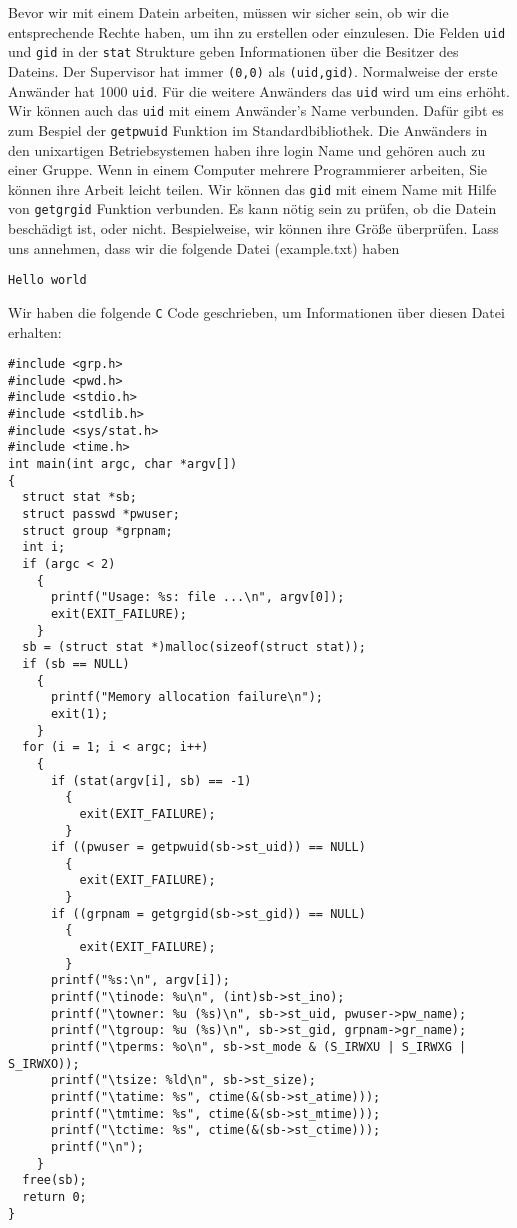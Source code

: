 Bevor wir mit einem Datein arbeiten, müssen wir sicher sein, ob wir die entsprechende Rechte haben, um ihn zu 
erstellen oder einzulesen. Die Felden \texttt{uid} und \texttt{gid} in der \texttt{stat} Strukture geben Informationen 
über die Besitzer des Dateins. Der Supervisor hat immer \texttt{(0,0)} als \texttt{(uid,gid)}. Normalweise der erste Anwänder 
hat 1000 \texttt{uid}. Für die weitere Anwänders das \texttt{uid} wird um eins erhöht. 
Wir können auch das \texttt{uid} mit einem Anwänder's Name verbunden. Dafür gibt es zum Bespiel der \texttt{getpwuid} 
Funktion im Standardbibliothek. Die Anwänders in den unixartigen Betriebsystemen haben ihre login Name und gehören
auch zu einer Gruppe. Wenn in einem Computer mehrere Programmierer arbeiten, Sie können ihre Arbeit leicht teilen. 
Wir können das \texttt{gid} mit einem Name mit Hilfe von \texttt{getgrgid} Funktion verbunden.
Es kann nötig sein zu prüfen, ob die Datein beschädigt ist, oder nicht.  Bespielweise, wir können ihre Größe
überprüfen. Lass uns annehmen, dass wir die folgende Datei (example.txt) haben
\begin{verbatim}
Hello world
\end{verbatim}
Wir haben die folgende \texttt{C} Code geschrieben, um Informationen über diesen Datei erhalten:
\begin{lstlisting}
#include <grp.h>
#include <pwd.h>
#include <stdio.h>
#include <stdlib.h>
#include <sys/stat.h>
#include <time.h>
int main(int argc, char *argv[])
{
  struct stat *sb;
  struct passwd *pwuser;
  struct group *grpnam;
  int i;
  if (argc < 2)
    {
      printf("Usage: %s: file ...\n", argv[0]);
      exit(EXIT_FAILURE);
    }
  sb = (struct stat *)malloc(sizeof(struct stat));
  if (sb == NULL)
    {
      printf("Memory allocation failure\n");
      exit(1);
    }
  for (i = 1; i < argc; i++)
    {
      if (stat(argv[i], sb) == -1)
        {
          exit(EXIT_FAILURE);
        }
      if ((pwuser = getpwuid(sb->st_uid)) == NULL)
        {
          exit(EXIT_FAILURE);
        }
      if ((grpnam = getgrgid(sb->st_gid)) == NULL)
        {
          exit(EXIT_FAILURE);
        }
      printf("%s:\n", argv[i]);
      printf("\tinode: %u\n", (int)sb->st_ino);
      printf("\towner: %u (%s)\n", sb->st_uid, pwuser->pw_name);
      printf("\tgroup: %u (%s)\n", sb->st_gid, grpnam->gr_name);
      printf("\tperms: %o\n", sb->st_mode & (S_IRWXU | S_IRWXG | S_IRWXO));
      printf("\tsize: %ld\n", sb->st_size);
      printf("\tatime: %s", ctime(&(sb->st_atime)));
      printf("\tmtime: %s", ctime(&(sb->st_mtime)));
      printf("\tctime: %s", ctime(&(sb->st_ctime)));
      printf("\n");
    }
  free(sb);
  return 0;
}
\end{lstlisting}
